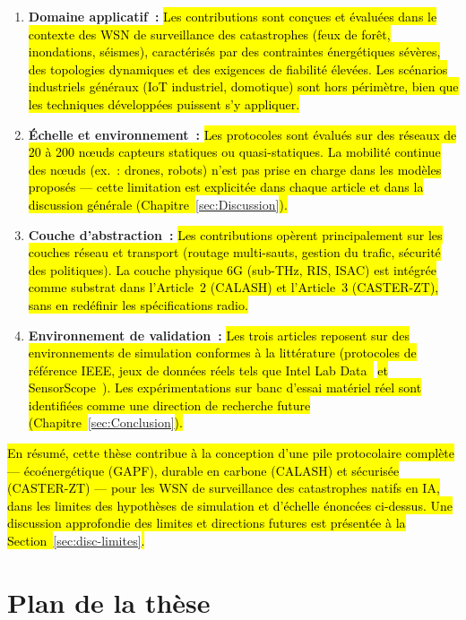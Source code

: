 \begin{enumerate}
    \item \textbf{Domaine applicatif~:} \hl{Les contributions sont conçues et évaluées dans le contexte des WSN de surveillance des catastrophes (feux de forêt, inondations, séismes), caractérisés par des contraintes énergétiques sévères, des topologies dynamiques et des exigences de fiabilité élevées. Les scénarios industriels généraux (IoT industriel, domotique) sont hors périmètre, bien que les techniques développées puissent s'y appliquer.}

    \item \textbf{Échelle et environnement~:} \hl{Les protocoles sont évalués sur des réseaux de 20 à 200 nœuds capteurs statiques ou quasi-statiques. La mobilité continue des nœuds (ex.~: drones, robots) n'est pas prise en charge dans les modèles proposés --- cette limitation est explicitée dans chaque article et dans la discussion générale (Chapitre~}\ref{sec:Discussion}\hl{).}

    \item \textbf{Couche d'abstraction~:} \hl{Les contributions opèrent principalement sur les couches réseau et transport (routage multi-sauts, gestion du trafic, sécurité des politiques). La couche physique 6G (sub-THz, RIS, ISAC) est intégrée comme substrat dans l'Article~2 (CALASH) et l'Article~3 (CASTER-ZT), sans en redéfinir les spécifications radio.}

    \item \textbf{Environnement de validation~:} \hl{Les trois articles reposent sur des environnements de simulation conformes à la littérature (protocoles de référence IEEE, jeux de données réels tels que Intel Lab Data~}\cite{intel_lab_data_2004}\hl{ et SensorScope~}\cite{sensorscope2008}\hl{). Les expérimentations sur banc d'essai matériel réel sont identifiées comme une direction de recherche future (Chapitre~}\ref{sec:Conclusion}\hl{).}
\end{enumerate}

\noindent \hl{En résumé, cette thèse contribue à la conception d'une pile protocolaire complète --- écoénergétique (GAPF), durable en carbone (CALASH) et sécurisée (CASTER-ZT) --- pour les WSN de surveillance des catastrophes natifs en IA, dans les limites des hypothèses de simulation et d'échelle énoncées ci-dessus. Une discussion approfondie des limites et directions futures est présentée à la Section~}\ref{sec:disc-limites}\hl{.}

\section{Plan de la thèse}\label{sec:Plan}


